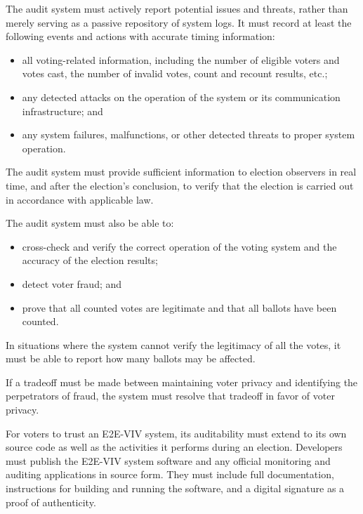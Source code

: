 The audit system must actively report potential issues and threats,
rather than merely serving as a passive repository of system logs. It
must record at least the following events and actions with accurate
timing information: 

\begin{itemize}
\item all voting-related information, including the number of eligible
  voters and votes cast, the number of invalid votes, count and
  recount results, etc.;
\item any detected attacks on the operation of the
  system or its communication infrastructure; and
\item any system failures,
  malfunctions, or other detected threats to proper system
  operation. 
\end{itemize}

The audit system must provide sufficient information to election
observers in real time, and after the election's conclusion, to verify
that the election is carried out in accordance with applicable law.

The audit system must also be able to:

\begin{itemize}
\item cross-check and verify the correct operation of the voting
  system and the accuracy of the election results;
\item detect voter fraud; and 
\item prove that all counted
votes are legitimate and that all ballots have been counted. 
\end{itemize}

In situations where the system cannot verify the legitimacy of all the
votes, it must be able to report how many ballots may be affected.

If a tradeoff must be made between maintaining voter privacy and
identifying the perpetrators of fraud, the system must resolve that
tradeoff in favor of voter privacy.

For voters to trust an E2E-VIV system, its auditability must extend to
its own source code as well as the activities it performs during an
election. Developers must publish the E2E-VIV system software and any
official monitoring and auditing applications in source form. They
must include full documentation, instructions for building and running
the software, and a digital signature as a proof of authenticity.


